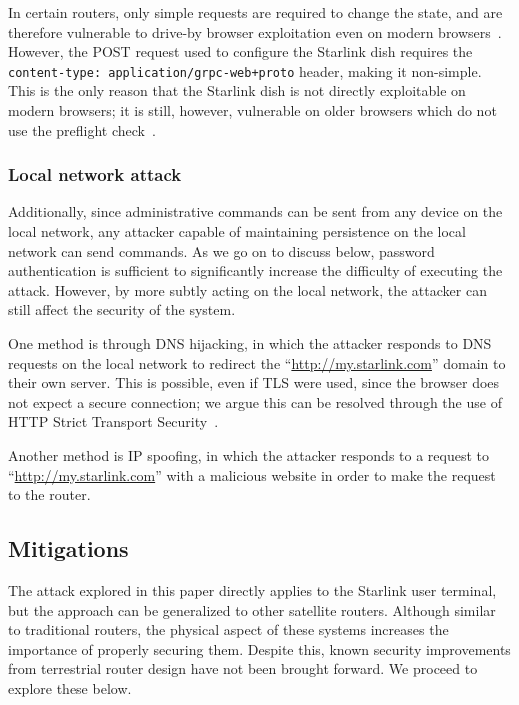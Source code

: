 In certain routers, only simple requests are required to change the state, and are therefore vulnerable to drive-by browser exploitation even on modern browsers~\cite{csrf_internal_network}.
However, the POST request used to configure the Starlink dish requires the \texttt{content-type: application/grpc-web+proto} header, making it non-simple.
This is the only reason that the Starlink dish is not directly exploitable on modern browsers; it is still, however, vulnerable on older browsers which do not use the preflight check~\cite{cors_w3c}.

\subsubsection{Local network attack}

Additionally, since administrative commands can be sent from any device on the local network, any attacker capable of maintaining persistence on the local network can send commands.
As we go on to discuss below, password authentication is sufficient to significantly increase the difficulty of executing the attack.
However, by more subtly acting on the local network, the attacker can still affect the security of the system.

One method is through DNS hijacking, in which the attacker responds to DNS requests on the local network to redirect the ``\url{http://my.starlink.com}'' domain to their own server.
This is possible, even if TLS were used, since the browser does not expect a secure connection; we argue this can be resolved through the use of HTTP Strict Transport Security~\cite{rfc6797}.

Another method is IP spoofing, in which the attacker responds to a request to ``\url{http://my.starlink.com}'' with a malicious website in order to make the request to the router.

\subsection{Mitigations}

The attack explored in this paper directly applies to the Starlink user terminal, but the approach can be generalized to other satellite routers.
Although similar to traditional routers, the physical aspect of these systems increases the importance of properly securing them.
Despite this, known security improvements from terrestrial router design have not been brought forward.
We proceed to explore these below.

